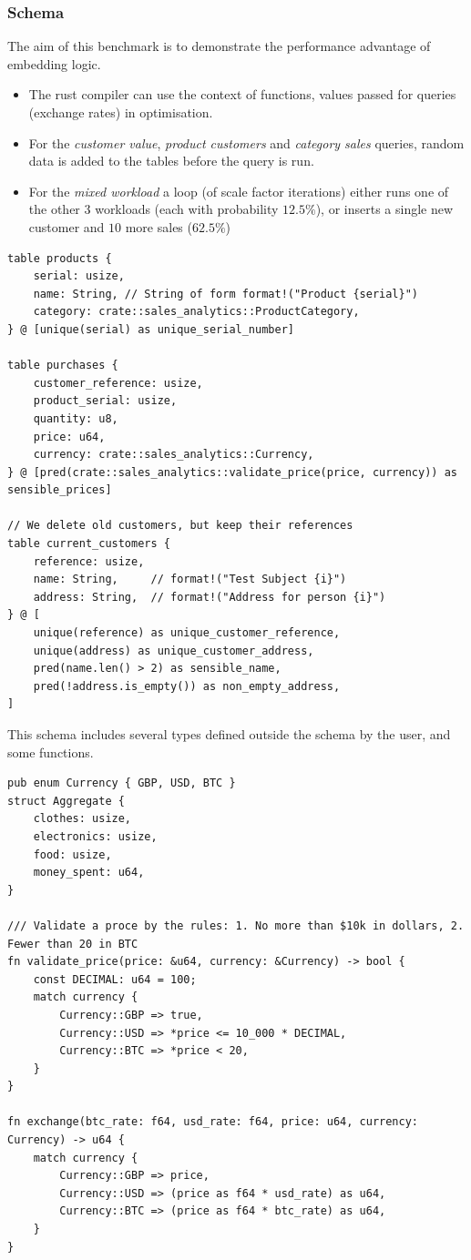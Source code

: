 \subsubsection{Schema}
The aim of this benchmark is to demonstrate the performance advantage of embedding logic.
\begin{itemize}
    \setlength\itemsep{0em}
    \item The rust compiler can use the context of functions, values passed for queries (exchange rates) in optimisation.
    \item For the \textit{customer value}, \textit{product customers} and \textit{category sales} queries, random data is added to the tables before the query is run.
    \item For the \textit{mixed workload} a loop (of scale factor iterations) either runs one of the other 3 workloads (each with probability $12.5\%$), or inserts a single new customer and $10$ more sales ($62.5\%$)
\end{itemize}
\begin{verbatim}
table products {
    serial: usize,
    name: String, // String of form format!("Product {serial}")
    category: crate::sales_analytics::ProductCategory,
} @ [unique(serial) as unique_serial_number]

table purchases {
    customer_reference: usize,
    product_serial: usize,
    quantity: u8,
    price: u64,
    currency: crate::sales_analytics::Currency,
} @ [pred(crate::sales_analytics::validate_price(price, currency)) as sensible_prices]

// We delete old customers, but keep their references
table current_customers {
    reference: usize,
    name: String,     // format!("Test Subject {i}")
    address: String,  // format!("Address for person {i}")
} @ [
    unique(reference) as unique_customer_reference,
    unique(address) as unique_customer_address,
    pred(name.len() > 2) as sensible_name,
    pred(!address.is_empty()) as non_empty_address,
]
\end{verbatim}
This schema includes several types defined outside the schema by the user, and some functions.
\begin{verbatim}
pub enum Currency { GBP, USD, BTC }
struct Aggregate {
    clothes: usize,
    electronics: usize,
    food: usize,
    money_spent: u64,
}

/// Validate a proce by the rules: 1. No more than $10k in dollars, 2. Fewer than 20 in BTC
fn validate_price(price: &u64, currency: &Currency) -> bool {
    const DECIMAL: u64 = 100;
    match currency {
        Currency::GBP => true,
        Currency::USD => *price <= 10_000 * DECIMAL,
        Currency::BTC => *price < 20,
    }
}

fn exchange(btc_rate: f64, usd_rate: f64, price: u64, currency: Currency) -> u64 {
    match currency {
        Currency::GBP => price,
        Currency::USD => (price as f64 * usd_rate) as u64,
        Currency::BTC => (price as f64 * btc_rate) as u64,
    }
}
\end{verbatim}

